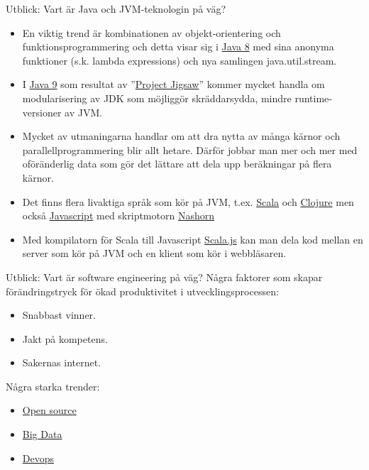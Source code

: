 \documentclass{lecturenotes}
\begin{document}

\begin{Slide}{Utblick: Vart är Java och JVM-teknologin på väg?}\footnotesize
\begin{itemize}
\item En viktig trend är kombinationen av objekt-orientering och funktionsprogrammering och detta visar sig i \href{http://www.oracle.com/technetwork/java/javase/8-whats-new-2157071.html}{Java 8} med sina anonyma funktioner (s.k. lambda expressions) och nya samlingen java.util.stream.
\item I \href{http://www.javaworld.com/article/2984263/java-platform/oracle-says-java-9-modules-will-be-a-boon-for-developers.html}{Java 9} som resultat av ''\href{http://www.infoworld.com/article/2895889/java/oracle-java-9-future-lego-like.html}{Project Jigsaw}'' kommer mycket handla om modularisering av JDK som möjliggör skräddarsydda, mindre runtime-versioner av JVM.	
\item Mycket av utmaningarna handlar om att dra nytta av många kärnor och parallellprogrammering blir allt hetare. Därför jobbar man mer och mer med oföränderlig data som gör det lättare att dela upp beräkningar på flera kärnor.
\item Det finns flera livaktiga språk som kör på JVM, t.ex.  \href{https://sv.wikipedia.org/wiki/Scala\_\%28programspr\%C3\%A5k\%29}{Scala} och  \href{https://sv.wikipedia.org/wiki/Clojure}{Clojure} men också \href{https://sv.wikipedia.org/wiki/Javascript}{Javascript} med skriptmotorn \href{https://en.wikipedia.org/wiki/Nashorn\_\%28JavaScript_engine\%29}{Nashorn} 
\item Med kompilatorn för Scala till Javascript \href{http://www.scala-js.org/}{Scala.js} kan man dela kod mellan en server som kör på JVM och en klient som kör i webbläsaren.
\end{itemize}
\end{Slide}

\begin{Slide}{Utblick: Vart är software engineering  på väg?}
Några faktorer som skapar förändringstryck för ökad produktivitet i utvecklingsprocessen:
\begin{itemize}
\item Snabbast vinner. 
\item Jakt på kompetens. 
\item Sakernas internet.
\end{itemize}
\vspace{1em}
Några starka trender:
\begin{itemize}
\item \href{https://en.wikipedia.org/wiki/Open_source}{Open source}
\item \href{https://en.wikipedia.org/wiki/Big_data}{Big Data}
\item \href{https://en.wikipedia.org/wiki/DevOps}{Devops}
\end{itemize}
\end{Slide}
\end{document}
